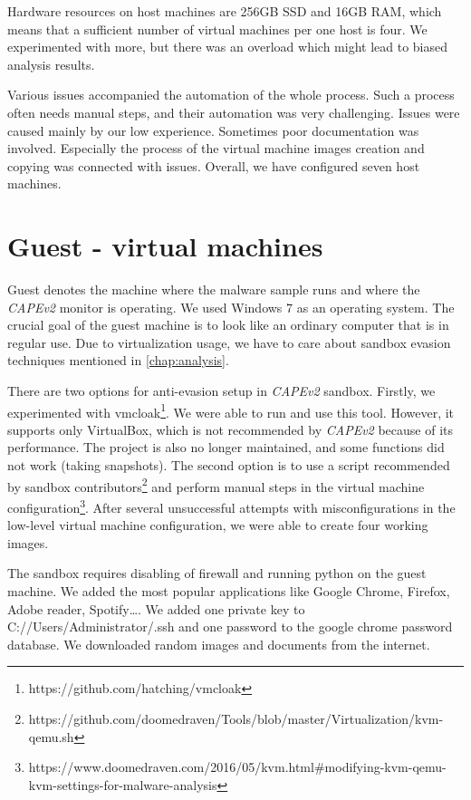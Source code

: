 Hardware resources on host machines are 256GB SSD and 16GB RAM, which means that a sufficient number of virtual machines per one host is four. We experimented with more, but there was an overload which might lead to biased analysis results.

Various issues accompanied the automation of the whole process. Such a process often needs manual steps, and their automation was very challenging. Issues were caused mainly by our low experience. Sometimes poor documentation was involved. Especially the process of the virtual machine images creation and copying was connected with issues. Overall, we have configured seven host machines.

\section{Guest - virtual machines}
Guest denotes the machine where the malware sample runs and where the \emph{CAPEv2} monitor is operating. We used Windows 7 as an operating system. The crucial goal of the guest machine is to look like an ordinary computer that is in regular use. Due to virtualization usage, we have to care about sandbox evasion techniques mentioned in \ref{chap:analysis}.

There are two options for anti-evasion setup in \emph{CAPEv2} sandbox. Firstly, we experimented with vmcloak\footnote{https://github.com/hatching/vmcloak}. We were able to run and use this tool. However, it supports only VirtualBox, which is not recommended by \emph{CAPEv2} because of its performance. The project is also no longer maintained, and some functions did not work (taking snapshots). The second option is to use a script recommended by sandbox contributors\footnote{https://github.com/doomedraven/Tools/blob/master/Virtualization/kvm-qemu.sh} and perform manual steps in the virtual machine configuration\footnote{https://www.doomedraven.com/2016/05/kvm.html\#modifying-kvm-qemu-kvm-settings-for-malware-analysis}. After several unsuccessful attempts with misconfigurations in the low-level virtual machine configuration, we were able to create four working images.

The sandbox requires disabling of firewall and running python on the guest machine. We added the most popular applications like Google Chrome, Firefox, Adobe reader, Spotify\dots. We added one private key to C://Users/Administrator/.ssh and one password to the google chrome password database. We downloaded random images and documents from the internet.

